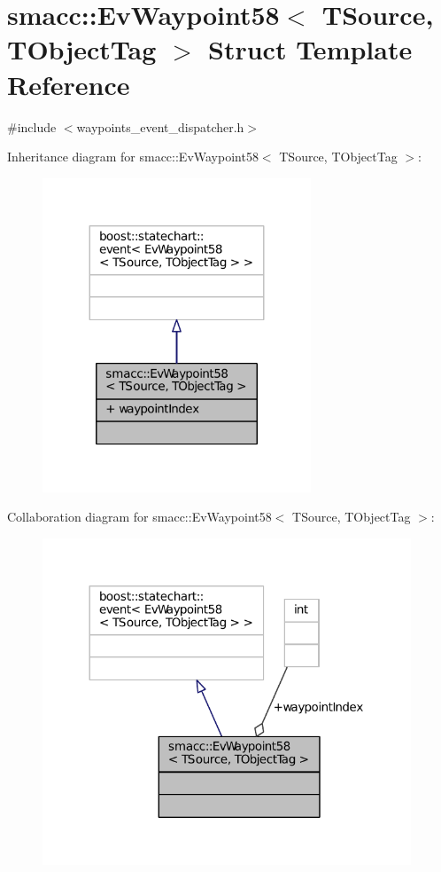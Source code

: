 \hypertarget{structsmacc_1_1EvWaypoint58}{}\section{smacc\+:\+:Ev\+Waypoint58$<$ T\+Source, T\+Object\+Tag $>$ Struct Template Reference}
\label{structsmacc_1_1EvWaypoint58}


{\ttfamily \#include $<$waypoints\+\_\+event\+\_\+dispatcher.\+h$>$}



Inheritance diagram for smacc\+:\+:Ev\+Waypoint58$<$ T\+Source, T\+Object\+Tag $>$\+:
\nopagebreak
\begin{figure}[H]
\begin{center}
\leavevmode
\includegraphics[width=227pt]{structsmacc_1_1EvWaypoint58__inherit__graph}
\end{center}
\end{figure}


Collaboration diagram for smacc\+:\+:Ev\+Waypoint58$<$ T\+Source, T\+Object\+Tag $>$\+:
\nopagebreak
\begin{figure}[H]
\begin{center}
\leavevmode
\includegraphics[width=312pt]{structsmacc_1_1EvWaypoint58__coll__graph}
\end{center}
\end{figure}
